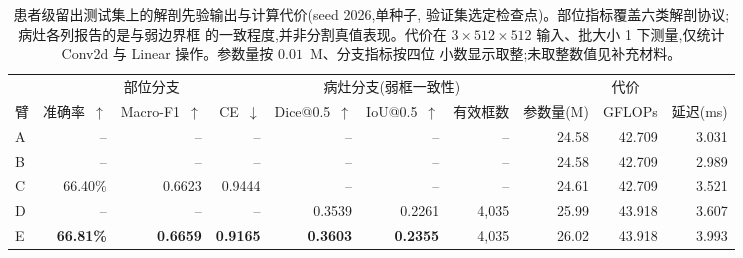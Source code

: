 \begin{table}[!t]
\centering
\caption{患者级留出测试集上的解剖先验输出与计算代价(seed 2026,单种子,
验证集选定检查点)。部位指标覆盖六类解剖协议;病灶各列报告的是与弱边界框
的一致程度,并非分割真值表现。代价在 $3\times512\times512$ 输入、批大小 1
下测量,仅统计 Conv2d 与 Linear 操作。参数量按 $0.01$~M、分支指标按四位
小数显示取整;未取整数值见补充材料。}
\label{tab:auxiliary}
\small
\begin{tabular}{@{}l rrr rrr rrr@{}}
\toprule
 & \multicolumn{3}{c}{部位分支} & \multicolumn{3}{c}{病灶分支(弱框一致性)} & \multicolumn{3}{c}{代价} \\
\cmidrule(lr){2-4} \cmidrule(lr){5-7} \cmidrule(lr){8-10}
臂 & 准确率~$\uparrow$ & Macro-F1~$\uparrow$ & CE~$\downarrow$ & Dice@0.5~$\uparrow$ & IoU@0.5~$\uparrow$ & 有效框数 & 参数量(M) & GFLOPs & 延迟(ms) \\
\midrule
A & --      & --     & --     & --     & --     & --    & 24.58 & 42.709 & 3.031 \\
B & --      & --     & --     & --     & --     & --    & 24.58 & 42.709 & 2.989 \\
C & 66.40\% & 0.6623 & 0.9444 & --     & --     & --    & 24.61 & 42.709 & 3.521 \\
D & --      & --     & --     & 0.3539 & 0.2261 & 4,035 & 25.99 & 43.918 & 3.607 \\
E & \textbf{66.81\%} & \textbf{0.6659} & \textbf{0.9165} & \textbf{0.3603} & \textbf{0.2355} & 4,035 & 26.02 & 43.918 & 3.993 \\
\bottomrule
\end{tabular}
\end{table}
